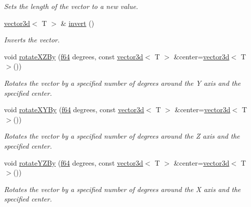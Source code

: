 \begin{DoxyCompactItemize}
\begin{DoxyCompactList}\small\item\em Sets the length of the vector to a new value. \end{DoxyCompactList}\item 
\mbox{\label{classirr_1_1core_1_1vector3d_a55a10e03bc09f87b95fc81ea0d508722}} 
\hyperlink{classirr_1_1core_1_1vector3d}{vector3d}$<$ T $>$ \& \hyperlink{classirr_1_1core_1_1vector3d_a55a10e03bc09f87b95fc81ea0d508722}{invert} ()
\begin{DoxyCompactList}\small\item\em Inverts the vector. \end{DoxyCompactList}\item 
void \hyperlink{classirr_1_1core_1_1vector3d_a621fbddb42814edd3d14410252cf7b7a}{rotate\+X\+Z\+By} (\hyperlink{namespaceirr_a1325b02603ad449f92c68fc640af9b28}{f64} degrees, const \hyperlink{classirr_1_1core_1_1vector3d}{vector3d}$<$ T $>$ \&center=\hyperlink{classirr_1_1core_1_1vector3d}{vector3d}$<$ T $>$())
\begin{DoxyCompactList}\small\item\em Rotates the vector by a specified number of degrees around the Y axis and the specified center. \end{DoxyCompactList}\item 
void \hyperlink{classirr_1_1core_1_1vector3d_ac38b75735ec06716305fbb09ec71784d}{rotate\+X\+Y\+By} (\hyperlink{namespaceirr_a1325b02603ad449f92c68fc640af9b28}{f64} degrees, const \hyperlink{classirr_1_1core_1_1vector3d}{vector3d}$<$ T $>$ \&center=\hyperlink{classirr_1_1core_1_1vector3d}{vector3d}$<$ T $>$())
\begin{DoxyCompactList}\small\item\em Rotates the vector by a specified number of degrees around the Z axis and the specified center. \end{DoxyCompactList}\item 
void \hyperlink{classirr_1_1core_1_1vector3d_aaa048312f75f152861479cb48e2ddfe4}{rotate\+Y\+Z\+By} (\hyperlink{namespaceirr_a1325b02603ad449f92c68fc640af9b28}{f64} degrees, const \hyperlink{classirr_1_1core_1_1vector3d}{vector3d}$<$ T $>$ \&center=\hyperlink{classirr_1_1core_1_1vector3d}{vector3d}$<$ T $>$())
\begin{DoxyCompactList}\small\item\em Rotates the vector by a specified number of degrees around the X axis and the specified center. \end{DoxyCompactList}\item 

\end{DoxyCompactItemize}
